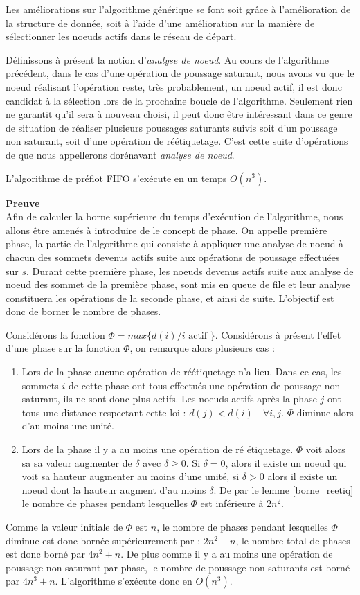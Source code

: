Les améliorations sur l'algorithme générique se font soit grâce à l'amélioration de la structure de
donnée, soit à l'aide d'une amélioration sur la manière de sélectionner les noeuds actifs dans le
réseau de départ.

Définissons à présent la notion d'\emph{analyse de noeud}. Au cours de l'algorithme précédent, dans
le cas d'une opération de poussage saturant, nous avons vu que le noeud réalisant l'opération reste,
très probablement, un noeud actif, il est donc candidat à la sélection lors de la prochaine boucle
de l'algorithme. Seulement rien ne garantit qu'il sera à nouveau choisi, il peut donc être
intéressant dans ce genre de situation de réaliser plusieurs poussages saturants suivis soit d'un
poussage non saturant, soit d'une opération de réétiquetage. C'est cette suite d'opérations de que
nous appellerons dorénavant \emph{analyse de noeud}.

\begin{thrm}
	L'algorithme de préflot FIFO s'exécute en un temps $O(n^3)$.
\end{thrm}

\textbf{Preuve} \\
Afin de calculer la borne supérieure du temps d'exécution de l'algorithme, nous allons être	amenés à
introduire de le concept de phase. On appelle première phase, la partie de l'algorithme qui consiste
à appliquer une analyse de noeud à chacun des sommets devenus actifs suite aux opérations de
poussage effectuées sur $s$. Durant cette première phase, les noeuds devenus actifs suite aux
analyse de noeud des sommet de la première phase, sont mis en queue de file et leur analyse
constituera les opérations de la seconde phase, et ainsi de suite. L'objectif est donc de borner le
nombre de phases.

Considérons la fonction $\Phi = max \{d(i) / i \mbox{ actif }\}$. Considérons à présent l'effet
d'une phase sur la fonction $\Phi$, on remarque alors plusieurs cas :
\begin{enumerate}
	\item Lors de la phase aucune opération de réétiquetage n'a lieu. Dans ce cas, les sommets $i$ de
		cette phase ont tous effectués une opération de poussage non saturant, ils ne sont donc plus
		actifs. Les noeuds actifs après la phase $j$ ont tous une distance respectant cette loi : $d(j)
		< d(i) \quad \forall i, j$. $\Phi$ diminue alors d'au moins une unité.
	\item Lors de la phase il y a au moins une opération de ré étiquetage. $\Phi$ voit alors sa sa
		valeur augmenter de $\delta$ avec $\delta \geq 0$. Si $\delta = 0$, alors il existe un noeud qui
		voit sa hauteur augmenter au moins d'une unité, si $\delta > 0$ alors il existe un noeud dont la
		hauteur augment d'au moins $\delta$. De par le lemme \ref{borne_reetiq} le nombre de phases
		pendant lesquelles $\Phi$ est inférieure à $2n^2$.
\end{enumerate}
Comme la valeur initiale de $\Phi$ est $n$, le nombre de phases pendant lesquelles $\Phi$ diminue
est donc bornée supérieurement par : $2n^2 + n$, le nombre total de phases est donc borné par $4n^2
+ n$. De plus comme il y a au moins une opération de poussage non saturant par phase, le nombre de
poussage non saturants est borné par $4n^3 + n$. L'algorithme s'exécute donc en $O(n^3)$.
